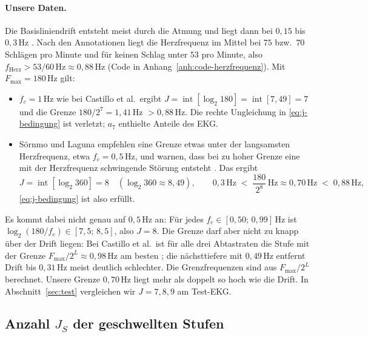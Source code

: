 \documentclass[a4paper,11pt,bibliography=totoc,listof=totoc,headinclude=true,cleardoublepage=empty,oneside]{scrbook}
\theoremstyle{plain}
\theoremstyle{definition}
\begin{document}
\paragraph{Unsere Daten.}
Die Basisliniendrift entsteht meist durch die Atmung und liegt dann bei
$0{,}15$ bis $0{,}3$\,Hz \cite[Abschn.~2.2.1]{castillo}. %
Nach den Annotationen liegt die Herzfrequenz im Mittel bei $75$ bzw.\ $70$
Schlägen pro Minute und für keinen Schlag unter $53$ pro Minute, also
$f_{\mathrm{Herz}} > 53/60\,\mathrm{Hz} \approx 0{,}88$\,Hz
(Code in Anhang~\ref{anh:code-herzfrequenz}). Mit
$F_{\max} = 180$\,Hz gilt:
\begin{itemize}
\item $f_c = 1$\,Hz wie bei Castillo et al.\ ergibt
  $J = \operatorname{int}[\log_2 180] = \operatorname{int}[7{,}49] = 7$ und
  die Grenze $180/2^7 = 1{,}41$\,Hz $> 0{,}88$\,Hz. Die rechte Ungleichung in
  \eqref{eq:j-bedingung} ist verletzt; $a_7$ enthielte Anteile des EKG.
\item Sörnmo und Laguna empfehlen eine Grenze etwas unter der langsamsten
  Herzfrequenz, etwa $f_c = 0{,}5$\,Hz, und warnen, dass bei zu hoher
  Grenze eine mit der Herzfrequenz schwingende Störung entsteht
  \cite[Kap.~7.1]{sornmo}. %
  Das ergibt
     \[
    J = \operatorname{int}[\log_2 360] = 8 \quad (\log_2 360 \approx 8{,}49),
    \qquad
    0{,}3\,\mathrm{Hz} \;<\; \frac{180}{2^8}\,\mathrm{Hz} \approx 0{,}70\,\mathrm{Hz}
    \;<\; 0{,}88\,\mathrm{Hz},
    \]
  \eqref{eq:j-bedingung} ist also erfüllt.
\end{itemize}
Es kommt dabei nicht genau auf $0{,}5$\,Hz an: Für jedes
$f_c \in [0{,}50;\,0{,}99]$\,Hz ist $\log_2(180/f_c) \in [7{,}5;\,8{,}5]$,
also $J = 8$. Die Grenze darf aber nicht zu knapp über der Drift liegen:
Bei Castillo et al.\ ist für alle drei Abtastraten die Stufe mit der Grenze
$F_{\max}/2^L \approx 0{,}98$\,Hz am besten \cite[Abschn.~4, Tab.~1]{castillo}; %
die nächsttiefere mit $0{,}49$\,Hz entfernt Drift bis $0{,}31$\,Hz meist
deutlich schlechter. Die Grenzfrequenzen sind aus $F_{\max}/2^L$ berechnet.
Unsere Grenze $0{,}70$\,Hz liegt mehr als doppelt so hoch wie die Drift. In
Abschnitt~\ref{sec:test} vergleichen wir $J = 7, 8, 9$ am Test-EKG.

\subsection{Anzahl $J_S$ der geschwellten Stufen}
\end{document}
